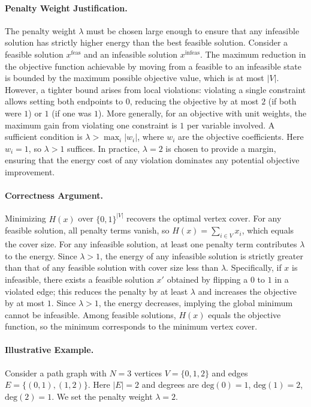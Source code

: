 \documentclass[12pt]{article}
\begin{document}
\paragraph{Penalty Weight Justification.}
The penalty weight $\lambda$ must be chosen large enough to ensure that any infeasible solution has strictly higher energy than the best feasible solution. Consider a feasible solution $x^{\text{feas}}$ and an infeasible solution $x^{\text{infeas}}$. The maximum reduction in the objective function achievable by moving from a feasible to an infeasible state is bounded by the maximum possible objective value, which is at most $|V|$. However, a tighter bound arises from local violations: violating a single constraint allows setting both endpoints to $0$, reducing the objective by at most $2$ (if both were $1$) or $1$ (if one was $1$). More generally, for an objective with unit weights, the maximum gain from violating one constraint is $1$ per variable involved. A sufficient condition is $\lambda > \max_{i} |w_i|$, where $w_i$ are the objective coefficients. Here $w_i = 1$, so $\lambda > 1$ suffices. In practice, $\lambda = 2$ is chosen to provide a margin, ensuring that the energy cost of any violation dominates any potential objective improvement.

\paragraph{Correctness Argument.}
Minimizing $H(x)$ over $\{0,1\}^{|V|}$ recovers the optimal vertex cover. For any feasible solution, all penalty terms vanish, so $H(x) = \sum_{i \in V} x_i$, which equals the cover size. For any infeasible solution, at least one penalty term contributes $\lambda$ to the energy. Since $\lambda > 1$, the energy of any infeasible solution is strictly greater than that of any feasible solution with cover size less than $\lambda$. Specifically, if $x$ is infeasible, there exists a feasible solution $x'$ obtained by flipping a $0$ to $1$ in a violated edge; this reduces the penalty by at least $\lambda$ and increases the objective by at most $1$. Since $\lambda > 1$, the energy decreases, implying the global minimum cannot be infeasible. Among feasible solutions, $H(x)$ equals the objective function, so the minimum corresponds to the minimum vertex cover.

\paragraph{Illustrative Example.}
Consider a path graph with $N=3$ vertices $V=\{0, 1, 2\}$ and edges $E=\{(0, 1), (1, 2)\}$. Here $|E|=2$ and degrees are $\text{deg}(0)=1$, $\text{deg}(1)=2$, $\text{deg}(2)=1$. We set the penalty weight $\lambda = 2$.
\end{document}
